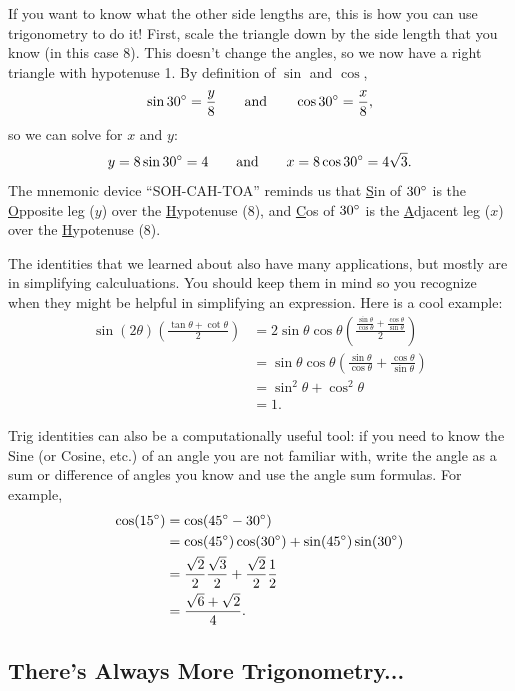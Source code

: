 If you want to know what the other side lengths are, this is how you can use trigonometry to do it! First, scale the triangle down by the side length that you know (in this case $8$). This doesn't change the angles, so we now have a right triangle with hypotenuse 1. By definition of $\sin$ and $\cos$,
$$\sin 30\degree = \frac{y}{8}\quad\quad\text{and}\quad\quad\cos 30\degree=\frac{x}{8},$$
so we can solve for $x$ and $y$:
$$y = 8\sin 30\degree = 4\quad\quad\text{and}\quad\quad x= 8\cos 30\degree= 4\sqrt{3}.$$
The mnemonic device ``SOH-CAH-TOA'' reminds us that \underline{S}in of $30\degree$ is the \underline{O}pposite leg ($y$) over the \underline{H}ypotenuse (8), and \underline{C}os of $30\degree$ is the \underline{A}djacent leg ($x$) over the \underline{H}ypotenuse (8). 

The identities that we learned about also have many applications, but mostly are in simplifying calculuations. You should keep them in mind so you recognize when they might be helpful in simplifying an expression. Here is a cool example:
\begin{align*}
\sin\left(2\theta\right)\left(\frac{\tan \theta+\cot \theta}{2}\right)
& = 2\sin\theta\cos\theta\left(\frac{\frac{\sin\theta}{\cos\theta}+\frac{\cos\theta}{\sin\theta}}{2}\right)\\
& = \sin\theta\cos\theta\left(\frac{\sin\theta}{\cos\theta}+\frac{\cos\theta}{\sin\theta}\right)\\
& = \sin^2\theta+\cos^2\theta\\
& = 1.
\end{align*}


Trig identities can also be a computationally useful tool: if you need to know the Sine (or Cosine, etc.) of an angle you are not familiar with, write the angle as a sum or difference of angles you know and use the angle sum formulas. For example,
\begin{align*}
\cos(15\degree) & = \cos(45\degree-30\degree) \\
                & = \cos(45\degree)\cos(30\degree)+\sin(45\degree)\sin(30\degree) \\
                & = \frac{\sqrt{2}}{2}\frac{\sqrt{3}}{2} + \frac{\sqrt{2}}{2}\frac{1}{2} \\
                & = \frac{\sqrt{6}+\sqrt{2}}{4}.
\end{align*}

\subsection{There's Always More Trigonometry...}

